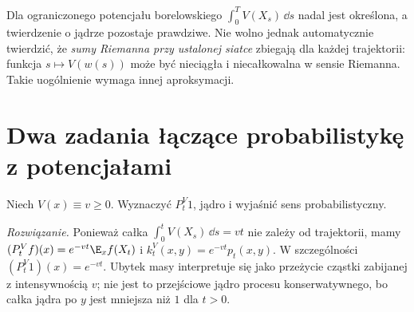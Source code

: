 \begin{uwaga}
Dla ograniczonego potencjału borelowskiego
$\int_0^TV(X_s)\,\dd s$ nadal jest określona,
a twierdzenie o jądrze pozostaje prawdziwe.
Nie wolno jednak automatycznie twierdzić, że \emph{sumy
Riemanna przy ustalonej siatce} zbiegają dla każdej
trajektorii: funkcja $s\mapsto V(w(s))$ może być
nieciągła i niecałkowalna w sensie Riemanna.
Takie uogólnienie wymaga innej aproksymacji.
\end{uwaga}

\begin{center}
\end{center}

\section{Dwa zadania łączące probabilistykę z potencjałami}

\begin{zadanie}
Niech $V(x)\equiv v\ge0$. Wyznaczyć $P_t^V1$,
jądro i wyjaśnić sens probabilistyczny.

\emph{Rozwiązanie.} Ponieważ całka $\int_0^t V(X_s)\,\dd s=vt$
nie zależy od trajektorii, mamy
$(P_t^Vf)(x)=e^{-vt}\E_xf(X_t)$ i
$k_t^V(x,y)=e^{-vt}p_t(x,y)$. W szczególności
$(P_t^V1)(x)=e^{-vt}$. Ubytek masy interpretuje się
jako przeżycie cząstki zabijanej z intensywnością $v$;
nie jest to przejściowe jądro procesu konserwatywnego,
bo całka jądra po $y$ jest mniejsza niż $1$ dla $t>0$.
\end{zadanie}

